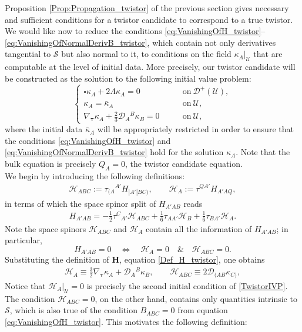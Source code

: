 \documentclass[10pt,a4paper]{article}
\theoremstyle{plain}
\def\bmH{{\bm H}}
\begin{document}
Proposition \ref{Prop:Propagation_twistor} of the previous section
gives necessary and sufficient conditions for a twistor candidate to
correspond to a true twistor. We would like now to reduce the
conditions
\eqref{eq:VanishingOfH_twistor}--\eqref{eq:VanishingOfNormalDerivB_twistor},
which contain not only derivatives tangential to $\mathcal{S}$ but
also normal to it, to conditions on the field
$\kappa_A|_{\mathcal{U}}$ that are computable at the level of initial
data. More precisely, our twistor candidate will be constructed as the
solution to the following initial value problem:
\begin{equation}\label{TwistorIVP}
    \left\{
\begin{array}{ll}
	 \square \kappa_A + 2\Lambda \kappa_A=0 & \qquad
         \text{on}~\mathcal{D}^{+}(\mathcal{U}),\\ \kappa_A =
         \bar{\kappa}_A
         &\qquad\text{on}~\mathcal{U},\\ \nabla_{\bm\tau} \kappa_{A} +
         \tfrac{2}{3}\mathcal{D}_{A}{}^{B}\kappa_{B}=0
         &\qquad\text{on}~\mathcal{U},
\end{array} \right.
\end{equation}
where the initial data $\bar{\kappa}_A$ will be appropriately
restricted in order to ensure that the conditions
\eqref{eq:VanishingOfH_twistor} and
\eqref{eq:VanishingOfNormalDerivB_twistor} hold for the solution
$\kappa_A$. Note that the bulk equation is precisely $Q_A=0$, the
twistor candidate equation.  \\

We begin by introducing the following definitions:
\begin{align}
  \mathcal{H} _{ABC} := \tau _{(A}{}^{A'}H_{|A'|BC)}, \qquad
  \mathcal{H}_{A} := \tau^{QA'} H_{A'AQ},
\end{align}
in terms of which the space spinor split of $H_{A'AB}$ reads
\begin{align}
  H_{A'AB} = - \tfrac{1}{2} \tau ^{C}{}_{A'} \mathcal{H} _{ABC} +
  \tfrac{1}{6} \tau_{AA'} \mathcal{H}_{B} + \tfrac{1}{6} \tau_{BA'}
  \mathcal{H}_{A}.
\end{align}
Note the space spinors $\mathcal{H} _{ABC}$ and $\mathcal{H}_{A}$
contain all the information of $H_{A'AB}$; in particular,
\[
H_{A'AB}=0 \quad                 
\iff \quad \mathcal{H} _{A}=0    
\quad
\& \quad \mathcal{H}_{ABC}=0.  
\]
Substituting the definition of $\bmH$, equation \eqref{Def_H_twistor},
one obtains
\begin{align}\label{spacespinordecompHtotwistorders}
\mathcal{H} _{A} \equiv \tfrac{3}{2} \nabla_{\bm\tau} \kappa_{A} +
\mathcal{D} _{A}{}^B\kappa_{B}, \qquad \mathcal{H} _{ABC} \equiv 2
\mathcal{D} _{(AB}\kappa _{C)},
\end{align}
Notice that $\mathcal{H}_A|_{\mathcal{U}}=0$ is precisely the second
initial condition of \eqref{TwistorIVP}. The condition
$\mathcal{H}_{ABC}=0$, on the other hand, contains only quantities
intrinsic to $\mathcal{S}$, which is also true of the condition
$B_{ABC}=0$ from equation \eqref{eq:VanishingOfH_twistor}.
This motivates the following definition:
\end{document}
